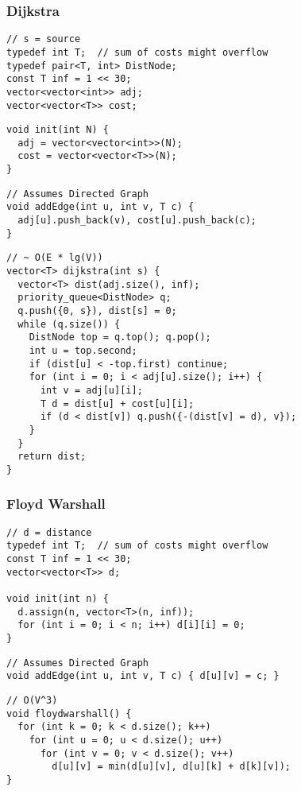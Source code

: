 \documentclass[twoside]{article}
\newcommand{\fileTitleStyle}{\large\underline}
\begin{document}
\begin{multicols*}{2}
\subsubsection*{Dijkstra}
\begin{verbatim}
// s = source
typedef int T;  // sum of costs might overflow
typedef pair<T, int> DistNode;
const T inf = 1 << 30;
vector<vector<int>> adj;
vector<vector<T>> cost;
\end{verbatim}
\vspace{-12pt}
\begin{verbatim}
void init(int N) {
  adj = vector<vector<int>>(N);
  cost = vector<vector<T>>(N);
}
\end{verbatim}
\vspace{-12pt}
\begin{verbatim}
// Assumes Directed Graph
void addEdge(int u, int v, T c) {
  adj[u].push_back(v), cost[u].push_back(c);
}
\end{verbatim}
\vspace{-12pt}
\begin{verbatim}
// ~ O(E * lg(V))
vector<T> dijkstra(int s) {
  vector<T> dist(adj.size(), inf);
  priority_queue<DistNode> q;
  q.push({0, s}), dist[s] = 0;
  while (q.size()) {
    DistNode top = q.top(); q.pop();
    int u = top.second;
    if (dist[u] < -top.first) continue;
    for (int i = 0; i < adj[u].size(); i++) {
      int v = adj[u][i];
      T d = dist[u] + cost[u][i];
      if (d < dist[v]) q.push({-(dist[v] = d), v});
    }
  }
  return dist;
}
\end{verbatim}

\subsubsectionfont{\centering\bfseries\Large}
\subsubsectionfont{\fileTitleStyle}
\subsubsection*{Floyd Warshall}
\begin{verbatim}
// d = distance
typedef int T;  // sum of costs might overflow
const T inf = 1 << 30;
vector<vector<T>> d;

void init(int n) {
  d.assign(n, vector<T>(n, inf));
  for (int i = 0; i < n; i++) d[i][i] = 0;
}
\end{verbatim}
\vspace{-12pt}
\begin{verbatim}
// Assumes Directed Graph
void addEdge(int u, int v, T c) { d[u][v] = c; }
\end{verbatim}
\vspace{-12pt}
\begin{verbatim}
// O(V^3)
void floydwarshall() {
  for (int k = 0; k < d.size(); k++)
    for (int u = 0; u < d.size(); u++)
      for (int v = 0; v < d.size(); v++)
        d[u][v] = min(d[u][v], d[u][k] + d[k][v]);
}
\end{verbatim}


\end{multicols*}
\end{document}
